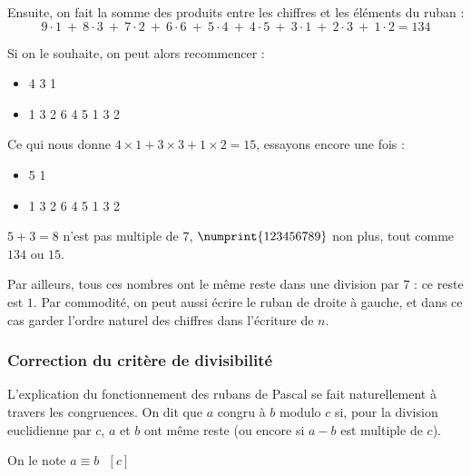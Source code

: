 \documentclass[a4paper, twoside]{article}
\begin{document}
		
	Ensuite, on fait la somme des produits entre les chiffres et les éléments du ruban :
	$$9 \cdot 1~+~8 \cdot 3~+~7 \cdot 2~+~6 \cdot 6~+~5 \cdot 4~+~4 \cdot 5~+~3 \cdot 1~+~2 \cdot 3~+~1 \cdot 2 = 134$$

	Si on le souhaite, on peut alors recommencer :

	\begin{itemize}
		\item[] 4 3 1 
		\item[] 1 3 2 6 4 5 1 3 2\\
	\end{itemize}

	Ce qui nous donne $ 4\times1 + 3\times3 + 1\times2 = 15 $, essayons encore une fois :

	\begin{itemize}
		\item[] 5 1
		\item[] 1 3 2 6 4 5 1 3 2\\
	\end{itemize}

	$5 + 3 = 8$ n'est pas multiple de $7$, $\numprint{123456789}$ non plus, tout comme $134$ ou $15$.

	\vspace{2mm}

	Par ailleurs, tous ces nombres ont le même reste dans une division par $7$ : ce reste est $1$. 
	Par commodité, on peut aussi écrire le ruban de droite à gauche, et dans ce cas garder l'ordre naturel des chiffres dans l'écriture de $n$.\\

	\vfill



	\subsubsection*{Correction du critère de divisibilité}\label{ruban_correction}

		L'explication du fonctionnement des rubans de Pascal se fait naturellement à travers les congruences. On dit que $a$ congru à $b$ modulo $c$ si, pour la division euclidienne par $c$, $a$ et $b$ ont même reste (ou encore si $a - b$ est multiple de $c$).
		
	\vspace{2 mm}
		
		On le note $a \equiv b ~~~ [c]$
		
	\vspace{2 mm}
		
\end{document}
